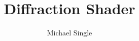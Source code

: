 \documentclass[12pt]{article}
\begin{document}
\title{Diffraction Shader}
\author{Michael Single}
\maketitle

\newpage{\pagestyle{empty} \cleardoublepage}
\tableofcontents
\newpage{\pagestyle{empty} \cleardoublepage}


\newpage{\pagestyle{empty} \cleardoublepage}

\newpage{\pagestyle{empty} \cleardoublepage}

\newpage{\pagestyle{empty} \cleardoublepage}

\newpage{\pagestyle{empty} \cleardoublepage}

\newpage{\pagestyle{empty} \cleardoublepage}

\newpage{\pagestyle{empty} \cleardoublepage}
\end{document}
